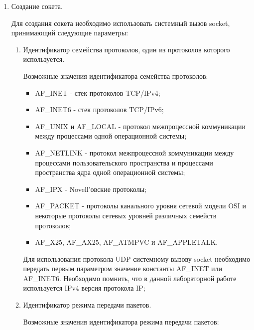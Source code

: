 	\begin{enumerate}

		\item Создание сокета.

			Для создания сокета необходимо использовать системный вызов socket, принимающий следующие параметры:

			\begin{enumerate}

				\item Идентификатор семейства протоколов, один из протоколов которого используется.

					Возможные значения идентификатора семейства протоколов:

					\begin{itemize}

						\item AF\_INET - стек протоколов TCP/IPv4;
						\item AF\_INET6 - стек протоколов TCP/IPv6;
						\item AF\_UNIX и AF\_LOCAL - протокол межпроцессной коммуникации между процессами одной операционной системы;
						\item AF\_NETLINK - протокол межпроцессной коммуникации между процессами пользовательского пространства
						и процессами пространства ядра одной операционной системы;
						\item AF\_IPX - Novell'овские протоколы;
						\item AF\_PACKET - протоколы канального уровня сетевой модели OSI и некоторые протоколы сетевых уровней различных семейств протоколов;
						\item AF\_X25, AF\_AX25, AF\_ATMPVC и AF\_APPLETALK.

					\end{itemize}

					Для использования протокола UDP системному вызову socket необходимо передать первым параметром значение константы AF\_INET или AF\_INET6.
					Необходимо помнить, что в данной лабораторной работе используется IPv4 версия протокола IP;

				\item Идентификатор режима передачи пакетов.
				
					Возможные значения идентификатора режима передачи пакетов:

					\begin{itemize}


\end{itemize}
\end{enumerate}
\end{enumerate}
